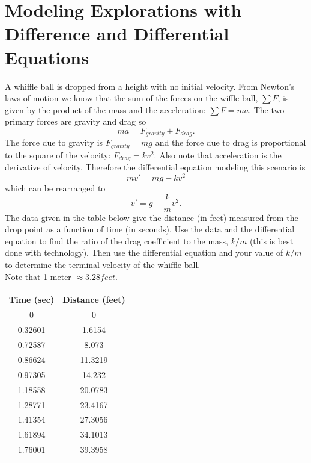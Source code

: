 \newpage\section{Modeling Explorations with Difference and Differential Equations}

\begin{problem}
    A whiffle ball is dropped from a height with no initial velocity.  From Newton's laws
    of motion we know that the sum of the forces on the wiffle ball, $\sum F$, is given by the product of
    the mass and the acceleration: $\sum F= ma$.  The two primary forces are gravity and
    drag so 
    \[ m a = F_{gravity} + F_{drag}. \]
    The force due to gravity is $F_{gravity} = mg$ and the force due to drag is
    proportional to the square of the velocity: $F_{drag} = k v^2$.  Also note that
    acceleration is the derivative of velocity.  Therefore the differential equation
    modeling this scenario is
    \[ m v' = mg - kv^2 \]
    which can be rearranged to 
    \[ v' = g - \frac{k}{m} v^2. \]
    The data given in the table below give the distance (in feet) measured from the drop
    point as a function of time (in seconds).  Use the data and the differential equation
    to find the ratio of the drag coefficient to the mass, $k/m$ (this is best done with
    technology). Then use the
    differential equation and your value of $k/m$ to determine the terminal velocity of
    the whiffle ball. \\
    Note that 1 meter $\approx 3.28 feet$.
    \begin{center}
        \begin{tabular}{|c|c|}
            \hline
            Time (sec) & Distance (feet) \\ \hline \hline
0  & 0\\
0.32601&1.6154\\
0.72587&8.073\\
0.86624&11.3219\\
0.97305&14.232\\
1.18558&20.0783\\
1.28771&23.4167\\
1.41354&27.3056\\
1.61894&34.1013\\
1.76001&39.3958\\ \hline
        \end{tabular}
    \end{center}
\end{problem}

